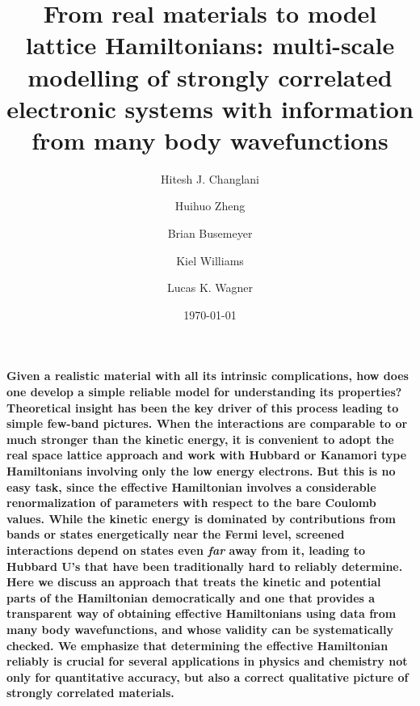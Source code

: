 \documentclass[prl,12pt,onecolumn,nofootinbib,notitlepage,english,superscriptaddress]{revtex4-1}
\begin{document}
\renewcommand{\thefootnote}{\fnsymbol{footnote}}
\renewcommand\abstractname{}
\title{From real materials to model lattice Hamiltonians: multi-scale modelling of strongly correlated electronic systems 
       with information from many body wavefunctions}

\author{Hitesh J. Changlani}
\author{Huihuo Zheng}
\author{Brian Busemeyer}
\author{Kiel Williams}
\author{Lucas K. Wagner}
\date{\today}
\maketitle

\textbf{
Given a realistic material with all its intrinsic complications, how does one develop a 
simple reliable model for understanding its properties? Theoretical insight has been the key driver of 
this process leading to simple few-band pictures. When the interactions are comparable 
to or much stronger than the kinetic energy, it is convenient to adopt the real space lattice 
approach and work with Hubbard or Kanamori type Hamiltonians involving only the low energy electrons. 
But this is no easy task, since the effective Hamiltonian involves a considerable renormalization of parameters with respect 
to the bare Coulomb values. While the kinetic energy is dominated by contributions from bands or states energetically 
near the Fermi level, screened interactions depend on states even \emph{far} away from it, leading to Hubbard U's 
that have been traditionally hard to reliably determine. 
Here we discuss an approach that treats the kinetic and potential parts of the Hamiltonian 
democratically and one that provides a transparent way of obtaining effective Hamiltonians using data from many body wavefunctions, 
and whose validity can be systematically checked.
We emphasize that determining the effective Hamiltonian reliably is crucial for 
several applications in physics and chemistry not only for quantitative accuracy, but also a 
correct qualitative picture of strongly correlated materials. 
}
\end{document}
